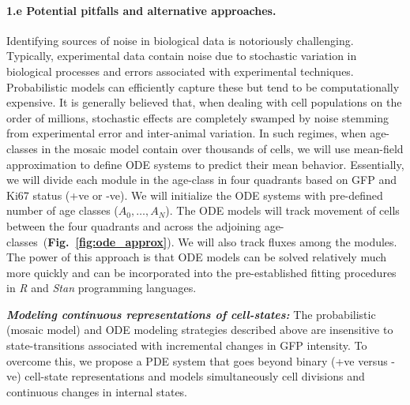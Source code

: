 \documentclass[11pt]{article}
\newcommand{\para}[1]{\vspace*{-4.5mm}\paragraph{#1}}
\begin{document}
\para{1.e Potential pitfalls and alternative approaches.}
Identifying sources of noise in biological data is notoriously challenging.
Typically, experimental data contain noise due to stochastic variation in biological processes and errors associated with experimental techniques.
Probabilistic models can efficiently capture these but tend to be computationally expensive.
It is generally believed that, when dealing with cell populations on the order of millions, stochastic effects are completely swamped by noise stemming from experimental error and inter-animal variation.
In such regimes, when age-classes in the mosaic model contain over thousands of cells, we will use mean-field approximation to
define ODE systems to predict their mean behavior. %
Essentially, we will divide each module in the age-class in four quadrants based on GFP and Ki67 status (+ve or -ve). %
We will initialize the ODE systems with pre-defined number of age classes ($A_0,\ldots,A_N$).
The ODE models will track movement of cells between the four quadrants and across the adjoining age-classes~(\textbf{Fig.~\ref{fig:ode_approx}}).
We will also track fluxes among the modules.
The power of this approach is that ODE models can be solved relatively much more quickly and can be incorporated into the pre-established fitting procedures in \textit{R} and \textit{Stan} programming languages.

\textbf{\textit{Modeling continuous representations of cell-states:}}
The probabilistic (mosaic model) and ODE modeling strategies described above %
are insensitive to state-transitions associated with incremental changes in GFP intensity. 
To overcome this, we propose a PDE system that goes beyond binary (+ve versus -ve) cell-state representations and models simultaneously cell divisions and continuous changes in internal states.
\end{document}
